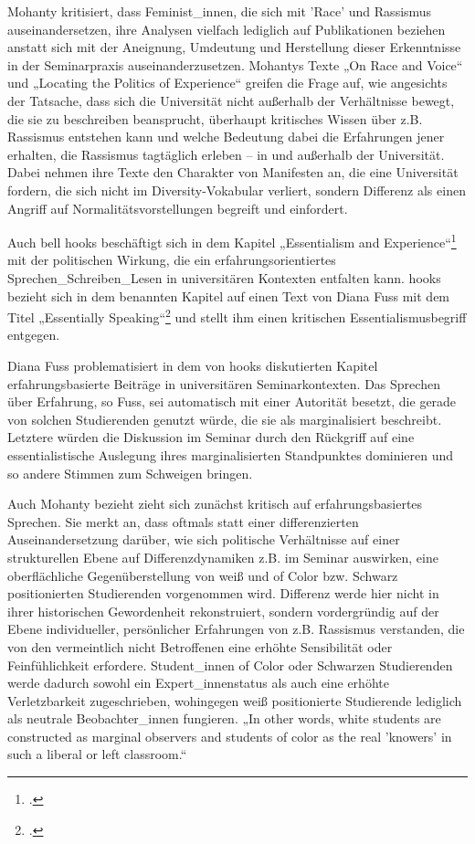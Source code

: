 Mohanty kritisiert, dass Feminist\_innen, die sich mit 'Race' und Rassismus
auseinandersetzen, ihre Analysen vielfach lediglich auf Publikationen beziehen
anstatt sich mit der Aneignung, Umdeutung und Herstellung dieser Erkenntnisse
in der Seminarpraxis auseinanderzusetzen. Mohantys Texte „On Race and
Voice“\footnotemark {} und
„Locating the Politics of Experience“\footnotemark{} greifen
die Frage auf, wie angesichts der Tatsache, dass sich die Universität nicht
außerhalb der Verhältnisse bewegt, die sie zu beschreiben beansprucht,
überhaupt kritisches Wissen über z.B. Rassismus entstehen kann und welche
Bedeutung dabei die Erfahrungen jener erhalten, die Rassismus tagtäglich
erleben – in und außerhalb der Universität. Dabei nehmen ihre Texte den
Charakter von Manifesten an, die eine Universität fordern, die sich nicht im
Diversity-Vokabular verliert, sondern Differenz als einen Angriff auf
Normalitätsvorstellungen begreift und einfordert.

Auch bell hooks beschäftigt sich in dem Kapitel „Essentialism and
Experience“\footnotemark\footcitetext{bellhooks}
mit der politischen Wirkung, die ein erfahrungsorientiertes
Sprechen\_Schreiben\_Lesen in universitären Kontexten entfalten kann. hooks
bezieht sich in dem benannten Kapitel auf einen Text von Diana Fuss mit dem
Titel „Essentially Speaking“\footnotemark\footcitetext[77]{bellhooks} und stellt ihm einen kritischen
Essentialismusbegriff entgegen.

Diana Fuss problematisiert in dem von hooks diskutierten Kapitel
erfahrungsbasierte Beiträge in universitären Seminarkontexten. Das Sprechen
über Erfahrung, so Fuss, sei automatisch mit einer Autorität besetzt, die
gerade von solchen Studierenden genutzt würde, die sie als marginalisiert
beschreibt. Letztere würden die Diskussion im Seminar durch den Rückgriff auf
eine essentialistische Auslegung ihres marginalisierten Standpunktes dominieren
und so andere Stimmen zum Schweigen bringen.\footnotemark{}

Auch Mohanty bezieht zieht sich zunächst kritisch auf erfahrungsbasiertes
Sprechen. Sie merkt an, dass oftmals statt einer differenzierten
Auseinandersetzung darüber, wie sich politische Verhältnisse auf einer
strukturellen Ebene auf Differenzdynamiken z.B. im Seminar auswirken, eine
oberflächliche Gegenüberstellung von weiß und of Color bzw. Schwarz
positionierten Studierenden vorgenommen wird. Differenz werde hier nicht in
ihrer historischen Gewordenheit rekonstruiert, sondern vordergründig auf der
Ebene individueller, persönlicher Erfahrungen von z.B. Rassismus verstanden,
die von den vermeintlich nicht Betroffenen eine erhöhte Sensibilität oder
Feinfühlichkeit erfordere. Student\_innen of Color oder Schwarzen Studierenden
werde dadurch sowohl ein Expert\_innenstatus als auch eine erhöhte
Verletzbarkeit zugeschrieben, wohingegen weiß positionierte Studierende
lediglich als neutrale Beobachter\_innen fungieren. „In other words, white
students are constructed as marginal observers and students of color as the
real 'knowers' in such a liberal or left
classroom.“\footnotemark{}

